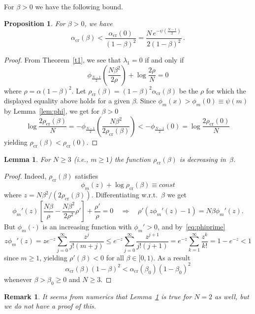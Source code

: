 \documentclass[12pt]{article}
\newtheorem{lemma}{Lemma}
\newtheorem{proposition}{Proposition}
\newtheorem{remark}{Remark}
\newcommand{\1}{\mathbf{1}}
\begin{document}
For $\beta>0$ we have the following bound.
\begin{proposition}
For $\beta > 0$, we have 
$$
\alpha_\mathrm{cr}(\beta) < \frac{\alpha_\mathrm{cr}(0)}{(1-\beta)^2}
 =\frac{N\, e^{-\psi\left(\frac{N-1}{2}\right)}}{2(1-\beta)^2}\,.
$$
\end{proposition}
\begin{proof}
From Theorem~\ref{t1}, we see that $\lambda_1=0$ if and only if
$$
\phi_{\frac{N-1}{2}}
\left(\frac{N\beta^2}{2\rho}\right)
+\log \frac{2\rho}N =0
$$
where $\rho=\alpha(1-\beta)^2$. Let $\rho_\mathrm{cr}(\beta)=(1-\beta)^2\alpha_\mathrm{cr}(\beta)$ be the $\rho$ for which the displayed equality above holds for a given $\beta$.
Since $\phi_m(x)>\phi_m(0)\equiv \psi(m)$ by Lemma~\ref{lem:phi}, we get for $\beta>0$
$$
\log \frac{2\rho_\mathrm{cr}(\beta)}N =
-\phi_{\frac{N-1}{2}}
\left(\frac{N\beta^2}{2\rho_\mathrm{cr}(\beta)}\right)
<-\phi_{\frac{N-1}{2}}(0)=\log \frac{2\rho_\mathrm{cr}(0)}N
$$
yielding $\rho_\mathrm{cr}(\beta)<\rho_\mathrm{cr}(0)$.
\end{proof}


\vskip 1cm
\begin{lemma}\label{lemrhomonotone}
For $N\ge 3$ (i.e., $m\ge 1$) the function $\rho_\mathrm{cr}(\beta)$ is decreasing in~$\beta$.    
\end{lemma}
\begin{proof}
Indeed,
$\rho_\mathrm{cr}(\beta)$ satisfies
$$
\phi_m(z)+\log \rho_\mathrm{cr}(\beta)\equiv const
$$
where $z=N\beta^2/(2\rho_\mathrm{cr}(\beta))$. Differentiating w.r.t.\ $\beta$ we get
$$
\phi_m'(z)\left[\frac{N\beta}{\rho}-\frac{N\beta^2}{2\rho^2}\rho'\right]+\frac{\rho'}{\rho}=0
\quad
\Longrightarrow
\quad
\rho'(z\phi_m'(z)-1)= N\beta \phi_m'(z).
$$
But $\phi_m(\cdot)$ is an increasing function with $\phi_m'>0$, and by~\eqref{eq:phiprime} 
\begin{equation}\label{E: zphiprime bound}
z\phi_m'(z)=z e^{-z}\sum_{j=0}^\infty \frac{z^j}{j!(m+j)}
\le  e^{-z}\sum_{j=0}^\infty \frac{z^{j+1}}{j!(j+1)}
= e^{-z}\sum_{k=1}^\infty \frac{z^k}{k!}
=1-e^{-z}<1
\end{equation}
since $m\ge 1$, yielding $\rho'(\beta)<0$ for all $\beta\in[0,1)$. As a result
$$
\alpha_\mathrm{cr}(\beta)(1-\beta)^2<\alpha_\mathrm{cr}(\beta_0)(1-\beta_0)^2
$$
whenever $\beta>\beta_0\ge 0$ and $N\ge 3$.
\end{proof}
\begin{remark}
It seems from numerics that Lemma~\ref{lemrhomonotone} is true for $N=2$ as well, but we do not have a proof of this. \end{remark}
\end{document}
